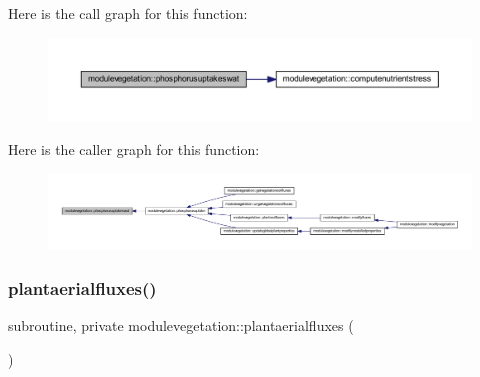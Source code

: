 Here is the call graph for this function\+:\nopagebreak
\begin{figure}[H]
\begin{center}
\leavevmode
\includegraphics[width=350pt]{namespacemodulevegetation_a4d0b983635068517bf0b541f0784430a_cgraph}
\end{center}
\end{figure}
Here is the caller graph for this function\+:\nopagebreak
\begin{figure}[H]
\begin{center}
\leavevmode
\includegraphics[width=350pt]{namespacemodulevegetation_a4d0b983635068517bf0b541f0784430a_icgraph}
\end{center}
\end{figure}
\mbox{\label{namespacemodulevegetation_a99cb73f235c051753d3cc48f59f56eae}} 
\subsubsection{\texorpdfstring{plantaerialfluxes()}{plantaerialfluxes()}}
{\footnotesize\ttfamily subroutine, private modulevegetation\+::plantaerialfluxes (\begin{DoxyParamCaption}{ }\end{DoxyParamCaption})\hspace{0.3cm}{\ttfamily [private]}}

